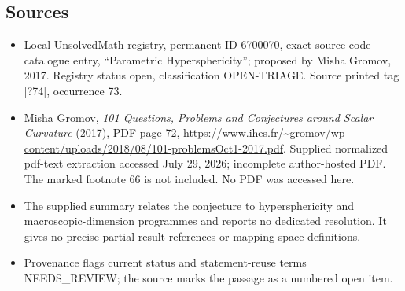 \documentclass[11pt]{article}
\begin{document}
\subsection{Sources}
\begin{itemize}
\item Local UnsolvedMath registry, permanent ID 6700070, exact source code catalogue entry, ``Parametric Hypersphericity''; proposed by Misha Gromov, 2017. Registry status open, classification OPEN-TRIAGE. Source printed tag [?74], occurrence 73.
\item Misha Gromov, \emph{101 Questions, Problems and Conjectures around Scalar Curvature} (2017), PDF page 72, \url{https://www.ihes.fr/~gromov/wp-content/uploads/2018/08/101-problemsOct1-2017.pdf}. Supplied normalized pdf-text extraction accessed July 29, 2026; incomplete author-hosted PDF. The marked footnote 66 is not included. No PDF was accessed here.
\item The supplied summary relates the conjecture to hypersphericity and macroscopic-dimension programmes and reports no dedicated resolution. It gives no precise partial-result references or mapping-space definitions.
\item Provenance flags current status and statement-reuse terms NEEDS\_REVIEW; the source marks the passage as a numbered open item.
\end{itemize}
\end{document}
